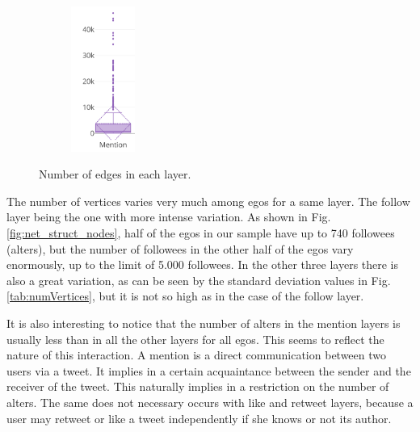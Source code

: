 \begin{figure}[h!tb]
\begin{subfigure}
    \end{subfigure}%
    ~ 
    \begin{subfigure}
        \centering
        \includegraphics[width=0.23\textwidth]{fig/net_struct/number_edges_mentions.png}
    \end{subfigure}
    \caption{Number of edges in each layer.}
    \label{fig:net_struct_edges}
\end{figure}



The number of vertices varies very much among egos for a same layer. The follow layer being the one with more intense variation. As shown in Fig. \ref{fig:net_struct_nodes}, half of the egos in our sample have up to 740 followees (alters), but the number of followees in the other half of the egos vary enormously, up to the limit of 5.000 followees. In the other three layers there is also a great variation, as can be seen by the standard deviation values in Fig. \ref{tab:numVertices}, but it is not so high as in the case of the follow layer. 

It is also interesting to notice that the number of alters in the mention layers is usually less than in all the other layers for all egos. This seems to reflect the nature of this interaction. A mention is a direct communication between two users via a tweet. It implies in a certain acquaintance between the sender and the receiver of the tweet. This naturally implies in a restriction on the number of alters. The same does not necessary occurs with like and retweet layers, because a user may retweet or like a tweet independently if she knows or not its author.



